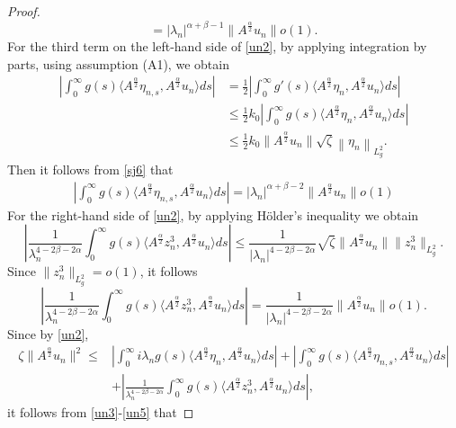 \documentclass[12pt,reqno]{article}
\begin{document}
\begin{proof}
\begin{equation}
			= |\lambda_n|^{\alpha + \beta - 1} \| A^{\frac{\alpha}{2}} u_n \| o(1).
		\end{equation}
		For the third term on the left-hand side of \eqref{un2}, by applying integration by parts, using assumption (A1), we obtain
\begin{align*}
\left| \int_0^\infty g(s) \langle A^{\frac{\alpha}{2}} \eta_{n,s}, A^{\frac{\alpha}{2}} u_n \rangle ds\right |
			&= \frac12\left|\int_0^\infty g'(s) \langle A^{\frac{\alpha}{2}} \eta_n, A^{\frac{\alpha}{2}} u_n \rangle ds \right|  \\
			&\leq \frac12k_0 \left| \int_0^\infty g(s) \langle A^{\frac{\alpha}{2}} \eta_n, A^{\frac{\alpha}{2}} u_n \rangle ds \right|  \\
			&\leq \frac12k_0 \| A^{\frac{\alpha}{2}} u_n \| \sqrt{\zeta} \left\| \eta_n \right\|_{L_g^2} .
\end{align*}
Then it follows from \eqref{sj6} that
		\begin{align}\label{un4}
		\left| \int_0^\infty g(s) \langle A^{\frac{\alpha}{2}} \eta_{n,s}, A^{\frac{\alpha}{2}} u_n \rangle ds\right |= |\lambda_n|^{\alpha+\beta-2}  \| A^{\frac{\alpha}{2}} u_n \| o(1)
		\end{align}
		 For the right-hand side of \eqref{un2}, by applying H\"older's inequality we obtain
\[\left| \frac{1}{\lambda_n^{4-2\beta-2\alpha}} \int_0^\infty g(s) \langle A^{\frac{\alpha}{2}} z_n^3, A^{\frac{\alpha}{2}} u_n \rangle ds \right|
			\le \frac{1}{|\lambda_n|^{4-2\beta-2\alpha}} \sqrt{\zeta} \| A^{\frac{\alpha}{2}} u_n \|\|z_n^3\|_{L_g^2}.\]
Since $\|z_n^3\|_{L_g^2}=o(1)$, it follows
		\begin{equation}\label{un5}
			\left| \frac{1}{\lambda_n^{4-2\beta-2\alpha}} \int_0^\infty g(s) \langle A^{\frac{\alpha}{2}} z_n^3, A^{\frac{\alpha}{2}} u_n \rangle ds \right|
			=\frac{1}{|\lambda_n|^{4-2\beta-2\alpha}}\| A^{\frac{\alpha}{2}} u_n \| o(1).
		\end{equation}
Since by \eqref{un2},
\begin{align*}
 \zeta\|A^{\frac{\alpha}{2}}u_n\|^2\le&\left| \int_0^\infty i\lambda_n g(s) \langle A^{\frac{\alpha}{2}} \eta_n, A^{\frac{\alpha}{2}} u_n \rangle ds \right|+\left| \int_0^\infty g(s) \langle A^{\frac{\alpha}{2}} \eta_{n,s}, A^{\frac{\alpha}{2}} u_n \rangle ds\right |\\
 &+\left| \frac{1}{\lambda_n^{4-2\beta-2\alpha}} \int_0^\infty g(s) \langle A^{\frac{\alpha}{2}} z_n^3, A^{\frac{\alpha}{2}} u_n \rangle ds \right|,
\end{align*}
it follows from \eqref{un3}-\eqref{un5} that

\end{proof}
\end{document}
